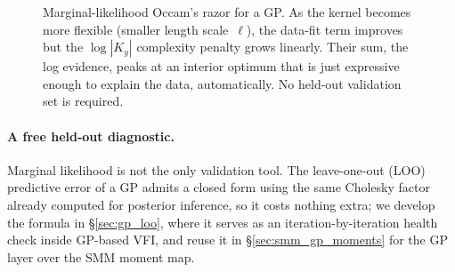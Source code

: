 \documentclass[11pt,a4paper]{report}
\begin{document}
\begin{figure}[ht]
\centering
{}
\caption{Marginal-likelihood Occam's razor for a GP.  As the kernel becomes more flexible (smaller length scale~$\ell$), the data-fit term improves but the $\log|K_y|$ complexity penalty grows linearly.  Their sum, the log evidence, peaks at an interior optimum that is just expressive enough to explain the data, automatically.  No held-out validation set is required.}
\label{fig:occam_marginal_likelihood}
\end{figure}

\paragraph{A free held-out diagnostic.}  Marginal likelihood is not the only validation tool.  The leave-one-out (LOO) predictive error of a GP admits a closed form using the same Cholesky factor already computed for posterior inference, so it costs nothing extra; we develop the formula in \S\ref{sec:gp_loo}, where it serves as an iteration-by-iteration health check inside GP-based VFI, and reuse it in \S\ref{sec:smm_gp_moments} for the GP layer over the SMM moment map.
\end{document}
